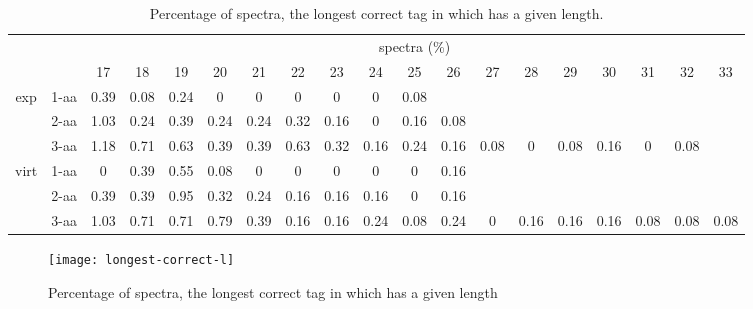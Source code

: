 \documentclass{article}[12pt]
\begin{document}
\begin{landscape}
\begin{table}[h]\tiny
\vspace{3mm}
{\centering
\begin{center}
\begin{tabular}{|c|l|c|c|c|c|c|c|c|c|c|c|c|c|c|c|c|c|c|}
  \hline
  \multicolumn{2}{|c|}{ } & \multicolumn{ 17 }{|c|}{ spectra (\%)} \\
  \cline{3- 19}
  \multicolumn{2}{|c|}{ }  & 17 & 18 & 19 & 20 & 21 & 22 & 23 & 24 & 25 & 26 & 27 & 28 & 29 & 30 & 31 & 32 & 33\\
  \hline
  \multirow{3}{*}{exp}
&  1-aa  & 0.39 & 0.08 & 0.24 & 0 & 0 & 0 & 0 & 0 & 0.08 &  &  &  &  &  &  &  & \\
&  2-aa  & 1.03 & 0.24 & 0.39 & 0.24 & 0.24 & 0.32 & 0.16 & 0 & 0.16 & 0.08 &  &  &  &  &  &  & \\
&  3-aa  & 1.18 & 0.71 & 0.63 & 0.39 & 0.39 & 0.63 & 0.32 & 0.16 & 0.24 & 0.16 & 0.08 & 0 & 0.08 & 0.16 & 0 & 0.08 & \\
 \hline
  \multirow{3}{*}{virt} 
&  1-aa  & 0 & 0.39 & 0.55 & 0.08 & 0 & 0 & 0 & 0 & 0 & 0.16 &  &  &  &  &  &  & \\
&  2-aa  & 0.39 & 0.39 & 0.95 & 0.32 & 0.24 & 0.16 & 0.16 & 0.16 & 0 & 0.16 &  &  &  &  &  &  & \\
&  3-aa  & 1.03 & 0.71 & 0.71 & 0.79 & 0.39 & 0.16 & 0.16 & 0.24 & 0.08 & 0.24 & 0 & 0.16 & 0.16 & 0.16 & 0.08 & 0.08 & 0.08\\
 \hline
\end{tabular}
\end{center}
\par}
\centering
\caption{ Percentage of spectra, the longest correct tag in which has a given length.}
\label{table:longest-correct-l}
\vspace{3mm}
\end{table}

\end{landscape}

\begin{figure}
  \begin{center}
\texttt{[image: longest-correct-l]}
\end{center}
\caption{Percentage of spectra, the longest correct tag in which has a given length}
  \label{fig:longest-correct-l}
\end{figure}
\end{document}
